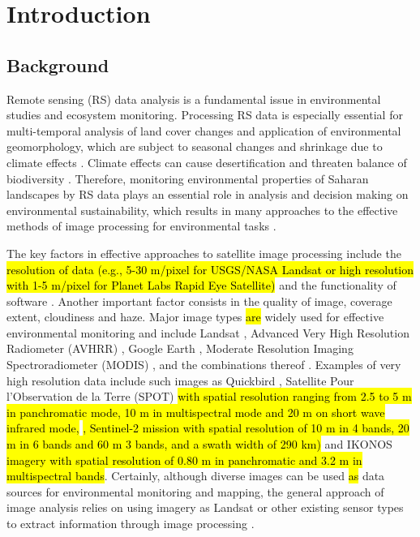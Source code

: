 \documentclass[land,article,submit,pdftex,moreauthors]{Definitions/mdpi}
\begin{document}
\section{Introduction}

\subsection{Background}

Remote sensing (RS) data analysis is a fundamental issue in environmental studies and ecosystem monitoring. Processing RS data is especially essential for multi-temporal analysis of land cover changes \cite{BOUSSETTA2022102564} and application of environmental geomorphology, which are subject to seasonal changes and shrinkage due to climate effects \cite{JonesMillington}. Climate effects can cause desertification \cite{Pontanier,info14040249} and threaten balance of biodiversity \cite{YAICHEACHOUR2023501}. Therefore, monitoring environmental properties of Saharan landscapes by RS data plays an essential role in analysis and decision making on environmental sustainability, which results in many approaches to the effective methods of image processing for environmental tasks \cite{Monget,Lemenkova202227,CAMPOS2018211}. 

The key factors in effective approaches to satellite image processing include the \hl{resolution of data (e.g., 5-30 m/pixel for USGS/NASA Landsat  or high resolution with 1-5 m/pixel for Planet Labs Rapid Eye Satellite) }and the functionality of software \cite{rs14236017}. Another important factor consists in the quality of image, coverage extent, cloudiness and haze. Major image types \hl{are} widely used for effective environmental monitoring and include Landsat \cite{BOUSSEMA2023185,SMIDA2022104643,jmse11040871}, Advanced Very High Resolution Radiometer (AVHRR) \cite{Bryant}, Google Earth \cite{LI2022252}, Moderate Resolution Imaging Spectroradiometer (MODIS) \cite{TOUHAMI2022103804,RHIF2022101596}, and the combinations thereof \cite{REBILLARD1984133}. Examples of very high resolution data include such images as Quickbird \cite{CHOUARI2021443}, Satellite Pour l’Observation de la Terre (SPOT) \hl{with spatial resolution ranging from 2.5 to 5 m in panchromatic mode, 10 m in multispectral mode and 20 m on short wave infrared mode, }\hl{, Sentinel-2 mission with spatial resolution of 10 m in 4 bands, 20 m in 6 bands and 60 m 3 bands, and a swath width of 290 km)} and IKONOS \hl{imagery with spatial resolution of 0.80 m in panchromatic and 3.2 m in multispectral bands}\cite{VELA2008591}. Certainly, although diverse images can be used \hl{as }data sources for environmental monitoring and mapping, the general approach of image analysis relies on using imagery as Landsat or other existing sensor types to extract information through image processing \cite{LiangWang}. 
\end{document}
